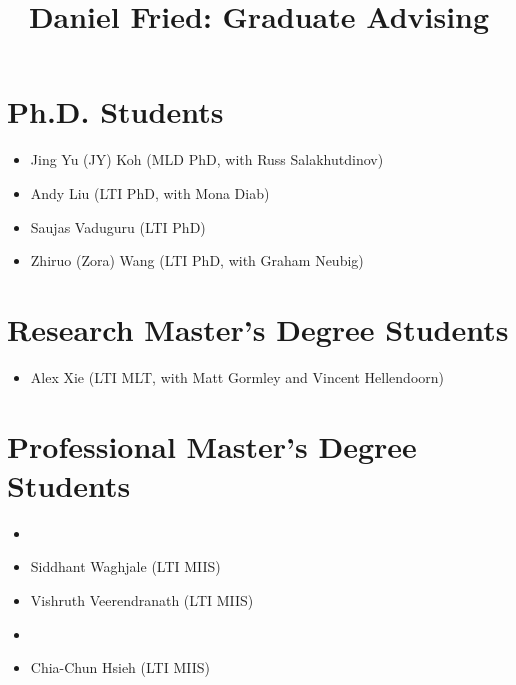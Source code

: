 \documentclass[11pt]{article}
\title{\vspace{-4em}Daniel Fried: Graduate Advising\vspace{-0.5em}}
\date{}
\begin{document}
\maketitle

\section*{Ph.D. Students}
\begin{itemize}
    \item Jing Yu (JY) Koh (MLD PhD, with Russ Salakhutdinov)
    \item Andy Liu (LTI PhD, with Mona Diab)
    \item Saujas Vaduguru (LTI PhD)
		\item Zhiruo (Zora) Wang (LTI PhD, with Graham Neubig)
\end{itemize}

\section*{Research Master's Degree Students}
\begin{itemize}
    \item Alex Xie (LTI MLT, with Matt Gormley and Vincent Hellendoorn)
\end{itemize}

\section*{Professional Master's Degree Students}
\begin{itemize}
\item[]\hspace{-2.5em}{2024}
    \item Siddhant Waghjale (LTI MIIS)
    \item Vishruth Veerendranath (LTI MIIS)
\item[]\hspace{-2.5em}{2023}
    \item Chia-Chun Hsieh (LTI MIIS)
\end{itemize}
\end{document}

